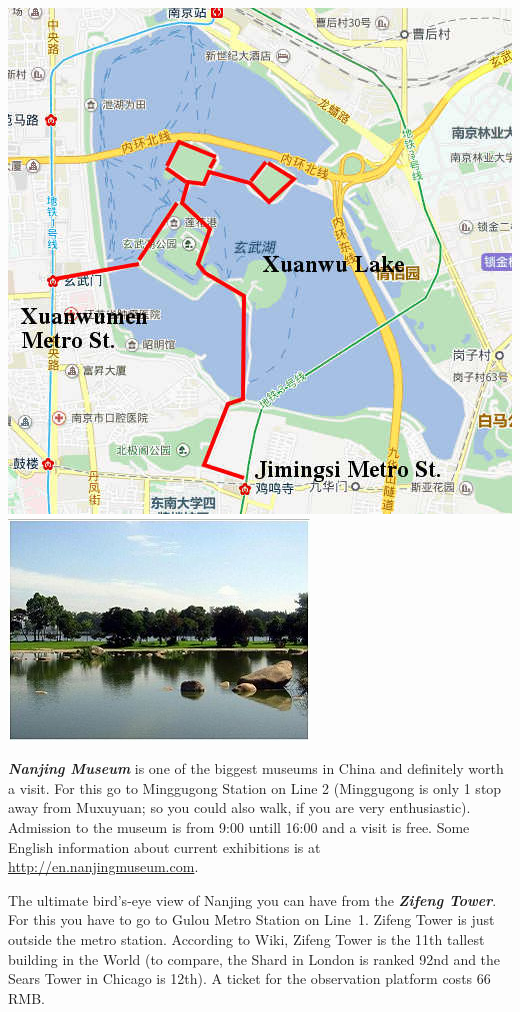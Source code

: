 \documentclass[11pt]{report}
\begin{document}
\begin{itemize}
\begin{center}
\includegraphics[scale=0.3]{travel_guide/map4.jpg}
\hspace{5mm}
\includegraphics[scale=1.2]{travel_guide/xianwulake.jpg}
\end{center}

\noindent \textbf{\textit{Nanjing Museum}} is one of the
biggest museums in China and definitely worth a visit. For
this go to Minggugong Station on Line 2 (Minggugong is only 1
stop away from Muxuyuan; so you could also walk, if you are
very enthusiastic). Admission to the museum is from 9:00 untill 
16:00 and a visit is free. Some English information about 
current exhibitions is at \url{http://en.nanjingmuseum.com}. 
\medskip


\noindent The ultimate bird's-eye view of Nanjing you can have
from the \textbf{\textit{Zifeng Tower}}. For this you have to go to
Gulou Metro Station on Line~1. Zifeng Tower is just outside
the metro station. According to Wiki, Zifeng Tower is the
11th tallest building in the World (to compare, the Shard in
London is ranked 92nd and the Sears Tower in Chicago is 12th).
A ticket for the observation platform costs 66 RMB.
\end{itemize}
\end{document}
